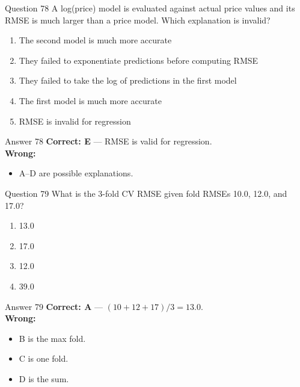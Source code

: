 \documentclass[aspectratio=169,11pt]{beamer}
\begin{document}
	\begin{frame}{Question 78}
		A log(price) model is evaluated against actual price values and its RMSE is much larger than a price model. Which explanation is invalid?
		\begin{enumerate}[label=\Alph*.]
			\item The second model is much more accurate
			\item They failed to exponentiate predictions before computing RMSE
			\item They failed to take the log of predictions in the first model
			\item The first model is much more accurate
			\item RMSE is invalid for regression
		\end{enumerate}
	\end{frame}
	\begin{frame}{Answer 78}
		\textbf{Correct: E} --- RMSE is valid for regression.\\
		\vspace{0.5em}
		\textbf{Wrong:}
		\begin{itemize}
			\item A--D are possible explanations.
		\end{itemize}
	\end{frame}
	
	\begin{frame}{Question 79}
		What is the 3-fold CV RMSE given fold RMSEs 10.0, 12.0, and 17.0?
		\begin{enumerate}[label=\Alph*.]
			\item 13.0
			\item 17.0
			\item 12.0
			\item 39.0
		\end{enumerate}
	\end{frame}
	\begin{frame}{Answer 79}
		\textbf{Correct: A} --- $(10+12+17)/3 = 13.0$.\\
		\vspace{0.5em}
		\textbf{Wrong:}
		\begin{itemize}
			\item B is the max fold.
			\item C is one fold.
			\item D is the sum.
		\end{itemize}
	\end{frame}
	
\end{document}
